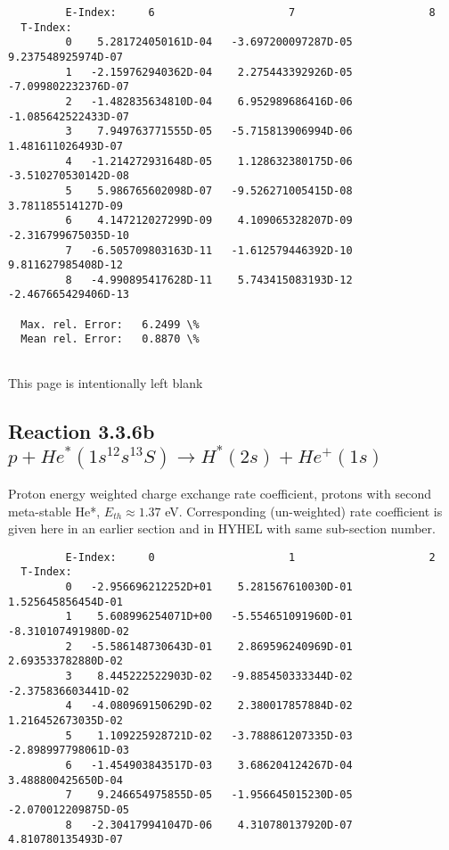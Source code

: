 \documentclass[12pt,dvipdfmx]{article}
\begin{document}
{\begin{small}
\begin{verbatim}
         E-Index:     6                     7                     8
  T-Index:
         0    5.281724050161D-04   -3.697200097287D-05    9.237548925974D-07
         1   -2.159762940362D-04    2.275443392926D-05   -7.099802232376D-07
         2   -1.482835634810D-04    6.952989686416D-06   -1.085642522433D-07
         3    7.949763771555D-05   -5.715813906994D-06    1.481611026493D-07
         4   -1.214272931648D-05    1.128632380175D-06   -3.510270530142D-08
         5    5.986765602098D-07   -9.526271005415D-08    3.781185514127D-09
         6    4.147212027299D-09    4.109065328207D-09   -2.316799675035D-10
         7   -6.505709803163D-11   -1.612579446392D-10    9.811627985408D-12
         8   -4.990895417628D-11    5.743415083193D-12   -2.467665429406D-13

  Max. rel. Error:   6.2499 \%
  Mean rel. Error:   0.8870 \%


\end{verbatim}\end{small}

\newpage
This page is intentionally left blank
\newpage

\subsection{
Reaction 3.3.6b  $  p + He^*(1s^12s^13S) \rightarrow H^*(2s) + He^+(1s)$
}
Proton energy weighted charge exchange rate coefficient,
protons with second meta-stable He*, $E_{th} \approx 1.37$ eV.
Corresponding (un-weighted) rate coefficient is given here in an earlier section and in HYHEL with same sub-section number.

\begin{small}\begin{verbatim}
         E-Index:     0                     1                     2
  T-Index:
         0   -2.956696212252D+01    5.281567610030D-01    1.525645856454D-01
         1    5.608996254071D+00   -5.554651091960D-01   -8.310107491980D-02
         2   -5.586148730643D-01    2.869596240969D-01    2.693533782880D-02
         3    8.445222522903D-02   -9.885450333344D-02   -2.375836603441D-02
         4   -4.080969150629D-02    2.380017857884D-02    1.216452673035D-02
         5    1.109225928721D-02   -3.788861207335D-03   -2.898997798061D-03
         6   -1.454903843517D-03    3.686204124267D-04    3.488800425650D-04
         7    9.246654975855D-05   -1.956645015230D-05   -2.070012209875D-05
         8   -2.304179941047D-06    4.310780137920D-07    4.810780135493D-07


\end{verbatim}
\end{small}}
\end{document}
